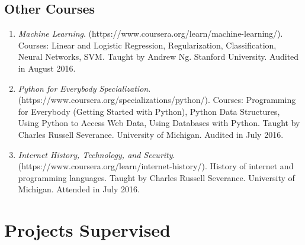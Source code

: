 \documentclass{article}
\begin{document}
\subsection*{Other Courses}

\begin{enumerate}
\item
{\it Machine Learning}.
(https://www.coursera.org/learn/machine-learning/).
Courses: Linear and Logistic Regression, Regularization, Classification, Neural Networks, SVM.
Taught by Andrew Ng.
Stanford University.
Audited in August 2016.

\item
{\it Python for Everybody Specialization}.
(https://www.coursera.org/specializations/python/).
Courses: Programming for Everybody (Getting Started with Python), Python Data Structures, Using Python to Access Web Data, Using Databases with Python.
Taught by Charles Russell Severance.
University of Michigan.
Audited in July 2016.

\item
{\it Internet History, Technology, and Security}.
(https://www.coursera.org/learn/internet-history/).
History of internet and programming languages.
Taught by Charles Russell Severance.
University of Michigan.
Attended in July 2016.
\end{enumerate}

\newpage


\section*{Projects Supervised}
\end{document}
